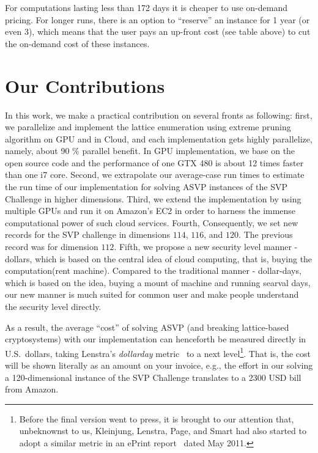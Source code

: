 \begin{CJK}{Bg5}{bsmi}
For computations lasting less than 172 days it is cheaper to use
on-demand pricing.  For longer runs, there is an option to ``reserve''
an instance for 1 year (or even 3), which means that the user pays an
up-front cost (see table above) to cut the on-demand cost of these
instances.




\section{Our Contributions}
In this work, we make a practical contribution on several fronts as following:
first, we parallelize and implement the lattice enumeration  using extreme pruning algorithm \cite{GamaNR10} on GPU and in Cloud, and each implementation gets highly parallelize, namely, about 90 \% parallel benefit. In GPU implementation, we base on the open source code \cite{GPUenum,DBLP:conf/africacrypt/HermansSBVP10} and the performance of one GTX 480 is about 12 times faster than one i7 core. 
%
Second, we extrapolate our average-case run times to estimate the run time of our implementation for solving ASVP instances of the SVP Challenge in higher dimensions.
%
Third, we extend the implementation by using multiple GPUs and run it on Amazon's EC2 in order to harness the immense computational power of such cloud services.
%
Fourth, Consequently, we set new records for the SVP challenge in dimensions $114$, $116$, and $120$. The previous record was for dimension $112$.
%
Fifth, we propose a new security level manner - dollars, which is based on the central idea of cloud computing, that is, buying the computation(rent machine). Compared to the traditional manner - dollar-days, which is based on the idea, buying a mount of machine and running searval days, our new manner is much suited for common user and make people understand the security level directly.


As a result, the average ``cost'' of solving ASVP (and breaking
lattice-based cryptosystems) with our implementation can henceforth be
measured directly in U.S.\ dollars, taking Lenstra's \emph{dollarday}
metric~\cite{Lenstra2004KeyLength} to a next level\footnote{Before the
  final version went to press, it is brought to our attention that,
  unbeknownst to us, Kleinjung, Lenstra, Page, and Smart had also
  started to adopt a similar metric in an ePrint
  report~\cite{KleinjungLPS11} dated May 2011.}.
%
That is, the cost will be shown literally as an amount on your
invoice, e.g., the effort in our solving a 120-dimensional instance of
the SVP Challenge translates to a  2300 USD bill from Amazon.


\end{CJK}
